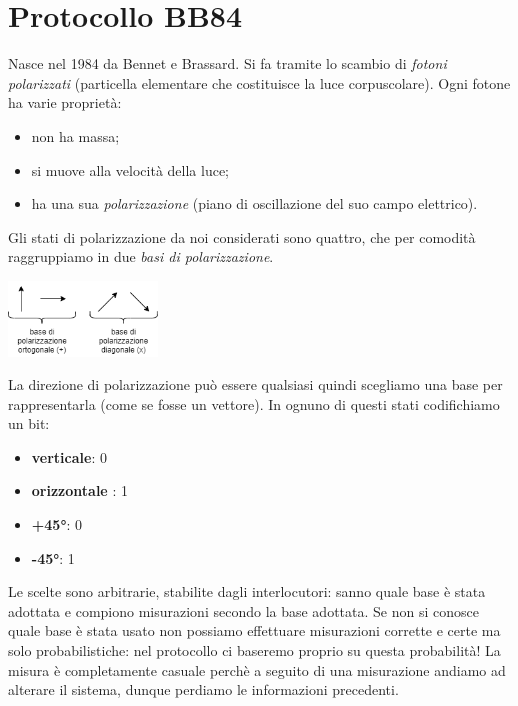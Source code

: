 \section{Protocollo BB84}
Nasce nel 1984 da Bennet e Brassard. Si fa tramite lo scambio di \emph{fotoni polarizzati} (particella elementare che costituisce la luce corpuscolare). Ogni fotone ha varie proprietà:
\begin{itemize}
	\item non ha massa;
	\item si muove alla velocità della luce;
	\item ha una sua \emph{polarizzazione} (piano di oscillazione del suo campo elettrico).
\end{itemize} 
Gli stati di polarizzazione da noi considerati sono quattro, che per comodità raggruppiamo in due \emph{basi di polarizzazione}.
\begin{center}
    \includegraphics[width=150px]{images/QDK_1.png}
\end{center}
La direzione di polarizzazione può essere qualsiasi quindi scegliamo una base per rappresentarla (come se fosse un vettore).
In ognuno di questi stati codifichiamo un bit:
\begin{multicols}{2}
\begin{itemize}
    \item \textbf{verticale}: 0
    \item \textbf{orizzontale} : 1
    \item \textbf{+45°}: 0
    \item \textbf{-45°}: 1
\end{itemize}
\end{multicols}
\noindent Le scelte sono arbitrarie, stabilite dagli interlocutori: sanno quale base è stata adottata e compiono misurazioni secondo la base adottata. Se non si conosce quale base è stata usato non possiamo effettuare misurazioni corrette e certe ma solo probabilistiche: nel protocollo ci baseremo proprio su questa probabilità! La misura è completamente casuale perchè a seguito di una misurazione andiamo ad alterare il sistema, dunque perdiamo le informazioni precedenti.
